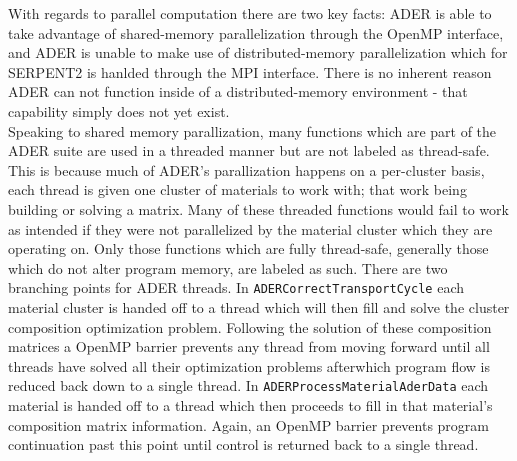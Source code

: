 With regards to parallel computation there are two key facts: ADER is able to
take advantage of shared-memory parallelization through the OpenMP interface,
and ADER is unable to make use of distributed-memory parallelization which for
SERPENT2 is hanlded through the MPI interface. There is no inherent reason ADER
can not function inside of a distributed-memory environment - that capability
simply does not yet exist. \\
Speaking to shared memory parallization, many functions which are part
of the ADER suite are used in a threaded manner but are not labeled as
thread-safe. This is because much of ADER's parallization happens on a
per-cluster basis, each thread is given one cluster of materials to work with;
that work being building or solving a matrix. Many of these threaded functions
would fail to work as intended if they were not parallelized by the material
cluster which they are operating on. Only those functions which are fully
thread-safe, generally those which do not alter program memory, are labeled as
such. There are two branching points for ADER threads. In
\texttt{ADERCorrectTransportCycle} each material cluster is handed off to a
thread which will then fill and solve the cluster composition optimization
problem. Following the solution of these composition matrices a
OpenMP barrier prevents any thread from moving forward until
all threads have solved all their optimization problems afterwhich program flow
is reduced back down to a single thread. In 
\texttt{ADERProcessMaterialAderData} each material is handed off to a thread
which then proceeds to fill in that material's composition matrix information.
Again, an OpenMP barrier prevents program continuation past this point until
control is returned back to a single thread. 
